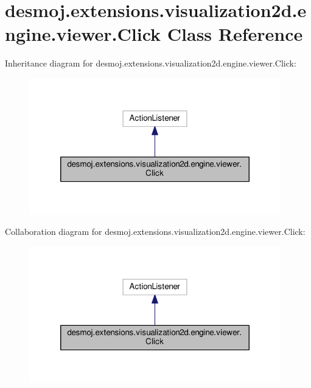 \section{desmoj.\-extensions.\-visualization2d.\-engine.\-viewer.\-Click Class Reference}
\label{classdesmoj_1_1extensions_1_1visualization2d_1_1engine_1_1viewer_1_1_click}


Inheritance diagram for desmoj.\-extensions.\-visualization2d.\-engine.\-viewer.\-Click\-:
\nopagebreak
\begin{figure}[H]
\begin{center}
\leavevmode
\includegraphics[width=310pt]{classdesmoj_1_1extensions_1_1visualization2d_1_1engine_1_1viewer_1_1_click__inherit__graph}
\end{center}
\end{figure}


Collaboration diagram for desmoj.\-extensions.\-visualization2d.\-engine.\-viewer.\-Click\-:
\nopagebreak
\begin{figure}[H]
\begin{center}
\leavevmode
\includegraphics[width=310pt]{classdesmoj_1_1extensions_1_1visualization2d_1_1engine_1_1viewer_1_1_click__coll__graph}
\end{center}
\end{figure}
